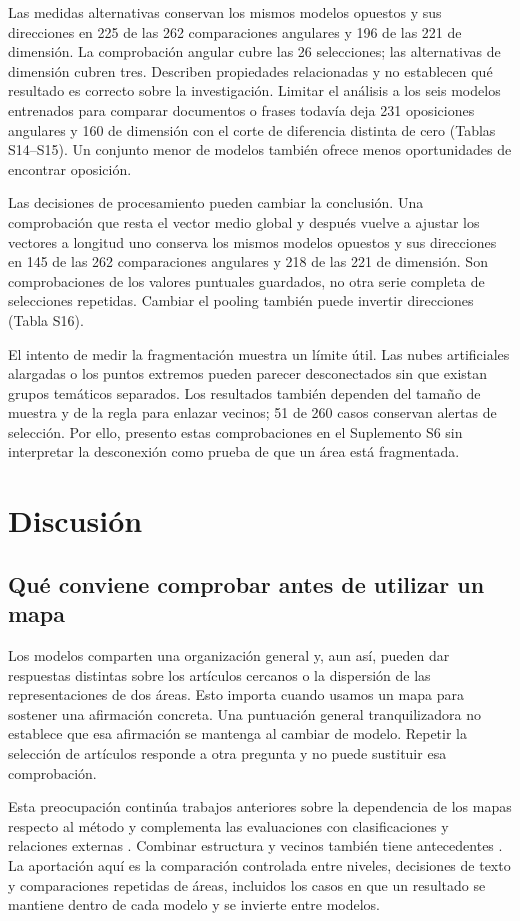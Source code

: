 Las medidas alternativas conservan los mismos modelos opuestos y sus direcciones en 225 de las 262 comparaciones angulares y 196 de las 221 de dimensión. La comprobación angular cubre las 26 selecciones; las alternativas de dimensión cubren tres. Describen propiedades relacionadas y no establecen qué resultado es correcto sobre la investigación. Limitar el análisis a los seis modelos entrenados para comparar documentos o frases todavía deja 231 oposiciones angulares y 160 de dimensión con el corte de diferencia distinta de cero (Tablas S14--S15). Un conjunto menor de modelos también ofrece menos oportunidades de encontrar oposición.

Las decisiones de procesamiento pueden cambiar la conclusión. Una comprobación que resta el vector medio global y después vuelve a ajustar los vectores a longitud uno conserva los mismos modelos opuestos y sus direcciones en 145 de las 262 comparaciones angulares y 218 de las 221 de dimensión. Son comprobaciones de los valores puntuales guardados, no otra serie completa de selecciones repetidas. Cambiar el pooling también puede invertir direcciones (Tabla S16).

El intento de medir la fragmentación muestra un límite útil. Las nubes artificiales alargadas o los puntos extremos pueden parecer desconectados sin que existan grupos temáticos separados. Los resultados también dependen del tamaño de muestra y de la regla para enlazar vecinos; 51 de 260 casos conservan alertas de selección. Por ello, presento estas comprobaciones en el Suplemento S6 sin interpretar la desconexión como prueba de que un área está fragmentada.

\section{Discusión}
\subsection{Qué conviene comprobar antes de utilizar un mapa}
Los modelos comparten una organización general y, aun así, pueden dar respuestas distintas sobre los artículos cercanos o la dispersión de las representaciones de dos áreas. Esto importa cuando usamos un mapa para sostener una afirmación concreta. Una puntuación general tranquilizadora no establece que esa afirmación se mantenga al cambiar de modelo. Repetir la selección de artículos responde a otra pregunta y no puede sustituir esa comprobación.

Esta preocupación continúa trabajos anteriores sobre la dependencia de los mapas respecto al método \citep{refa0d2d707e6,ref6a2f5912bc} y complementa las evaluaciones con clasificaciones y relaciones externas \citep{refbe130e2973,refc0e2cc29e0}. Combinar estructura y vecinos también tiene antecedentes \citep{ref4e1e0d5582}. La aportación aquí es la comparación controlada entre niveles, decisiones de texto y comparaciones repetidas de áreas, incluidos los casos en que un resultado se mantiene dentro de cada modelo y se invierte entre modelos.


